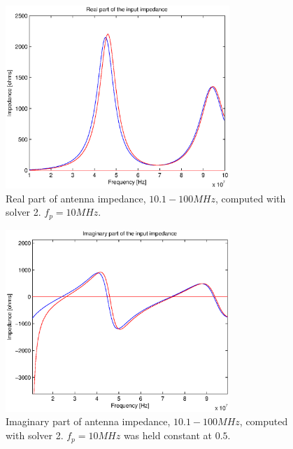 \documentclass[two-column,ras]{agutex}
\begin{document}
\begin{article}
\begin{figure}
  \noindent\includegraphics[width=20pc]{imps_dipole_solver2_real2.eps}
\caption{Real part of antenna impedance, $10.1 - 100 MHz$, computed with solver 2. $f_p=10MHz$.}
\label{fig:impedances_dipole_solver2_real2}
\end{figure}

\begin{figure}
\noindent\includegraphics[width=20pc]{imps_dipole_solver2_imag2.eps}
\caption{Imaginary part of antenna impedance, $10.1 - 100 MHz$, computed with solver 2. $f_p=10MHz$ was held constant at $0.5$.}
\label{fig:impedances_dipole_solver2_imag2}
\end{figure}


\end{article}
\end{document}
